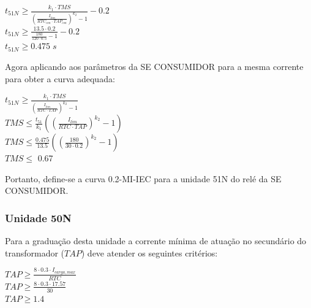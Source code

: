 \begin{center}
$t_{51N} \geq \frac{k_1 \cdot TMS}{\left(\frac{I_{lim}}{RTC_{con} \cdot TAP_{con}}\right)^{k_2}-1} - 0.2$ \\ \vspace{5pt}
$t_{51N} \geq \frac{13.5 \cdot 0.2}{\frac{180}{120 \cdot 0.5}-1} - 0.2$ \\ \vspace{5pt}
$t_{51N} \geq 0.475 \; s$ \\ \vspace{5pt}
\end{center}

Agora aplicando aos parâmetros da SE CONSUMIDOR para a mesma corrente para obter a curva adequada:

\begin{center}
$t_{51N} \geq \frac{k_1 \cdot TMS}{\left(\frac{I_{lim}}{RTC \cdot TAP}\right)^{k_2}-1}$ \\ \vspace{5pt}
$TMS \leq \frac{t_{51}}{k_1} \left(\left(\frac{I_{lim}}{RTC \cdot TAP}\right)^{k_2}-1\right)$ \\ \vspace{5pt}
$TMS \leq \frac{0.475}{13.5} \left(\left(\frac{180}{30 \cdot 0.2}\right)^{k_2}-1\right)$ \\ \vspace{5pt}
$TMS \leq $ 0.67\\ \vspace{5pt}
\end{center}

Portanto, define-se a curva 0.2-MI-IEC para a unidade 51N do relé da SE CONSUMIDOR.

\subsubsection{Unidade 50N}

Para a graduação desta unidade a corrente mínima de atuação no secundário do transformador ($TAP$) deve atender os seguintes critérios:

\begin{center}
$TAP \geq \frac{8 \cdot 0.3 \cdot I_{carga,max}}{RTC}$ \\ \vspace{5pt}
$TAP \geq \frac{8 \cdot 0.3 \cdot 17.57}{30} $ \\ \vspace{5pt}
$TAP \geq  1.4$ \\ \vspace{5pt}
\end{center}


